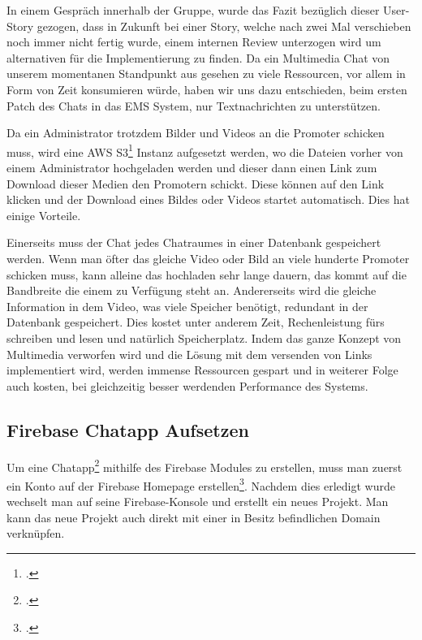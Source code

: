 In einem Gespräch innerhalb der Gruppe, wurde das Fazit bezüglich dieser User-Story gezogen, dass in Zukunft bei einer Story, welche nach zwei Mal verschieben noch immer nicht
fertig wurde, einem internen Review unterzogen wird um alternativen für die Implementierung zu finden. Da ein Multimedia Chat von unserem momentanen Standpunkt aus gesehen zu viele
Ressourcen, vor allem in Form von Zeit konsumieren würde, haben wir uns dazu entschieden, beim ersten Patch des Chats in das EMS System, nur Textnachrichten zu unterstützen.

Da ein Administrator trotzdem Bilder und Videos an die
Promoter schicken muss, wird eine AWS S3\footcite{aws-s3} Instanz aufgesetzt werden, wo die Dateien vorher von einem Administrator hochgeladen werden und dieser dann einen Link zum Download dieser Medien den Promotern schickt. Diese können auf
den Link klicken und der Download eines Bildes oder Videos startet automatisch. Dies hat einige Vorteile.

Einerseits muss der Chat jedes Chatraumes in einer Datenbank gespeichert werden. Wenn man öfter das gleiche Video oder Bild
an viele hunderte Promoter schicken muss, kann alleine das hochladen sehr lange dauern, das kommt auf die Bandbreite die einem zu Verfügung steht an. Andererseits wird die gleiche Information in dem Video, was viele Speicher benötigt,
redundant in der Datenbank gespeichert. Dies kostet unter anderem Zeit, Rechenleistung fürs schreiben und lesen und natürlich Speicherplatz. Indem das ganze Konzept von Multimedia verworfen wird und die Lösung mit dem versenden von
Links implementiert wird, werden immense Ressourcen gespart und in weiterer Folge auch kosten, bei gleichzeitig besser werdenden Performance des Systems.
\subsection{Firebase Chatapp Aufsetzen}
Um eine Chatapp\footcite{Chatapp-Beispiel} mithilfe des Firebase Modules zu erstellen, muss man zuerst ein Konto auf der Firebase Homepage erstellen\footcite{firebase-site}.
Nachdem dies erledigt wurde wechselt man auf seine Firebase-Konsole und erstellt ein neues Projekt. Man kann das neue Projekt auch direkt mit einer in Besitz befindlichen Domain verknüpfen.

